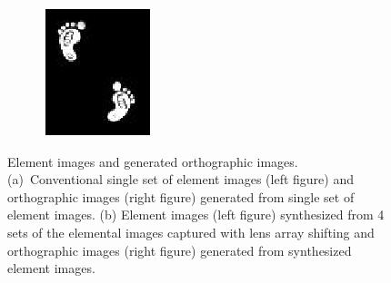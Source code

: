 \documentclass[10pt,letterpaper]{article}
\begin{document}
\begin{figure}[!htb]
\begin{subfigure}[b]{0.48\linewidth}
      \centering \includegraphics[width=0.3\linewidth]{foot_ei_conv1} 
  \caption{}
  \end{subfigure}
\caption{Element images and generated orthographic images. (a)~Conventional single set of element images (left figure) and orthographic images (right figure) generated from single set of element images. (b) Element images (left figure) synthesized from 4 sets of the elemental images captured with lens array shifting and orthographic images (right figure) generated from synthesized element images.}
\label{fig_16}
\end{figure}



    
\end{document}
